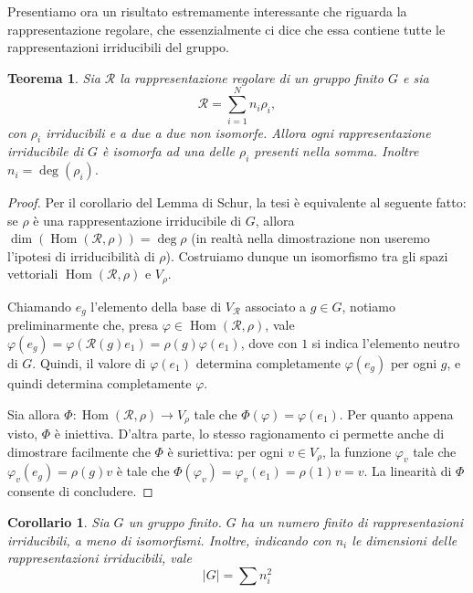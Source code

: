 \documentclass[11pt]{article}
\theoremstyle{plain}
\newtheorem{thm}{Teorema}[section]
\newtheorem*{cor}{Corollario}
\theoremstyle{definition}
\theoremstyle{remark}
\newcommand{\dsum}{\displaystyle\sum}
\DeclareMathOperator{\Hom}{Hom}
\begin{document}
Presentiamo ora un risultato estremamente interessante che riguarda la rappresentazione regolare, che essenzialmente ci dice
che essa contiene tutte le rappresentazioni irriducibili del gruppo.
\begin{thm}
Sia $\mathcal{R}$ la rappresentazione regolare di un gruppo finito $G$ e sia
\[ \mathcal{R} = \dsum_{i=1}^Nn_i \rho_i,\]
con $\rho_i$ irriducibili e a due a due non isomorfe.
Allora ogni rappresentazione irriducibile di $G$ è isomorfa ad una delle $\rho_i$ presenti nella somma. Inoltre $n_i = \deg(\rho_i).$
\label{thm: teorema importantissimo}
\end{thm}
\begin{proof}
Per il corollario del Lemma di Schur, la tesi è equivalente al seguente fatto: se $\rho$ è una rappresentazione irriducibile di $G$, allora $\dim\left(\Hom(\mathcal{R},\rho)\right)=\deg\rho$ (in realtà nella dimostrazione non useremo l'ipotesi di irriducibilità di $\rho$). Costruiamo dunque un isomorfismo tra gli spazi vettoriali $\Hom(\mathcal{R},\rho)$ e $V_\rho$.

Chiamando $e_g$ l'elemento della base di $V_\mathcal{R}$ associato a $g\in G$, notiamo preliminarmente che, presa $\varphi\in\Hom(\mathcal{R},\rho)$, vale $\varphi(e_g)=\varphi(\mathcal{R}(g)e_{1})=\rho(g)\varphi(e_1)$, dove con $1$ si indica l'elemento neutro di $G$. Quindi, il valore di $\varphi(e_1)$ determina completamente $\varphi(e_g)$ per ogni $g$, e quindi determina completamente $\varphi$.

Sia allora $\Phi\colon\Hom(\mathcal{R},\rho)\to V_\rho$ tale che $\Phi(\varphi)=\varphi(e_{1})$. Per quanto appena visto, $\Phi$ è iniettiva. D'altra parte, lo stesso ragionamento ci permette anche di dimostrare facilmente che $\Phi$ è suriettiva: per ogni $v\in V_\rho$, la funzione $\varphi_v$ tale che $\varphi_v(e_g)=\rho(g)v$ è tale che $\Phi(\varphi_v)=\varphi_v(e_1)=\rho(1)v=v$. La linearità di $\Phi$ consente di concludere.
\end{proof}

\begin{cor}
Sia $G$ un gruppo finito. $G$ ha un numero finito di rappresentazioni irriducibili, a meno di isomorfismi.
Inoltre, indicando con $n_i$ le dimensioni delle rappresentazioni irriducibili, vale
\[|G| = \dsum n_i^2\]
\end{cor}
\end{document}
